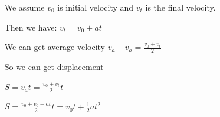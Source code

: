\documentclass[12pt]{article}
\begin{document}
~\newline
We assume $v_{0}$ is initial velocity and $v_{t}$ is the final velocity. 

~\newline
Then we have:
$v_{t}=v_{0}+at$

~\newline
We can get average velocity $v_{a}$
~\newline
$v_{a}=\frac{v_{0}+v_{t}}{2}$

~\newline
So we can get displacement

~\newline 
$S=v_{a}t=\frac{v_{0}+v_{t}}{2}t$

~\newline
$S=\frac{v_{0}+v_{0}+at}{2}t=v_{0}t+\frac{1}{2}at^{2}$


~\newline
\end{document}

